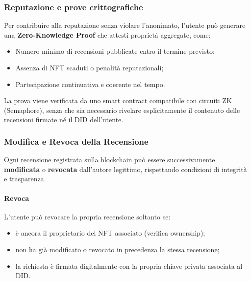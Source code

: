             \subsubsection{Reputazione e prove crittografiche}
                \noindent Per contribuire alla reputazione senza violare l'anonimato, l'utente può generare una \textbf{Zero-Knowledge Proof} che attesti proprietà aggregate, come:
                    \begin{itemize}
                        \item Numero minimo di recensioni pubblicate entro il termine previsto;
                        
                        \item Assenza di NFT scaduti o penalità reputazionali;
                        
                        \item Partecipazione continuativa e coerente nel tempo.
                    \end{itemize}

                \noindent La prova viene verificata da uno smart contract compatibile con circuiti ZK (Semaphore), senza che sia necessario rivelare esplicitamente il contenuto delle recensioni firmate né il DID dell'utente.

            \subsubsection{Modifica e Revoca della Recensione}
                \noindent Ogni recensione registrata sulla blockchain può essere successivamente \textbf{modificata} o \textbf{revocata} dall'autore legittimo, rispettando condizioni di integrità e trasparenza.
                
                \paragraph{Revoca}
                    L'utente può revocare la propria recensione soltanto se:
                        \begin{itemize}
                            \item è ancora il proprietario del NFT associato (verifica ownership);
                            
                            \item non ha già modificato o revocato in precedenza la stessa recensione;
                            
                            \item la richiesta è firmata digitalmente con la propria chiave privata associata al DID.
                        \end{itemize}
                    
